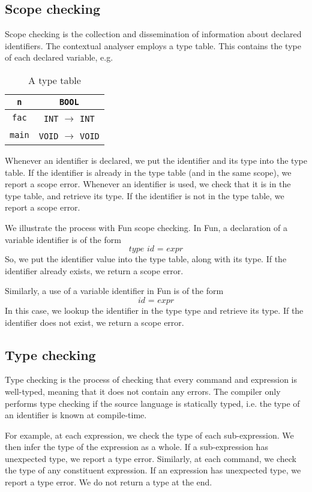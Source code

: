 \documentclass[a4paper, openany]{memoir}
\begin{document}
\subsection{Scope checking}
Scope checking is the collection and dissemination of information about declared identifiers. The contextual analyser employs a type table. This contains the type of each declared variable, e.g.
\begin{table}[H]
    \centering
    \begin{tabular}{c|c}
        \texttt{n} & \texttt{BOOL} \\
        \hline
        \texttt{fac} & \texttt{INT} $\to$ \texttt{INT} \\
        \texttt{main} & \texttt{VOID} $\to$ \texttt{VOID}
    \end{tabular}
    \caption{A type table}
\end{table}

Whenever an identifier is declared, we put the identifier and its type into the type table. If the identifier is already in the type table (and in the same scope), we report a scope error. Whenever an identifier is used, we check that it is in the type table, and retrieve its type. If the identifier is not in the type table, we report a scope error.

We illustrate the process with Fun scope checking. In Fun, a declaration of a variable identifier is of the form
\[\textit{type id } \texttt{=} \textit{ expr}\]
So, we put the identifier value into the type table, along with its type. If the identifier already exists, we return a scope error.

Similarly, a use of a variable identifier in Fun is of the form
\[\textit{id } \texttt{=} \textit{ expr}\]
In this case, we lookup the identifier in the type type and retrieve its type. If the identifier does not exist, we return a scope error.

\subsection{Type checking}
Type checking is the process of checking that every command and expression is well-typed, meaning that it does not contain any errors. The compiler only performs type checking if the source language is statically typed, i.e. the type of an identifier is known at compile-time.

For example, at each expression, we check the type of each sub-expression. We then infer the type of the expression as a whole. If a sub-expression has unexpected type, we report a type error. Similarly, at each command, we check the type of any constituent expression. If an expression has unexpected type, we report a type error. We do not return a type at the end.
\end{document}
